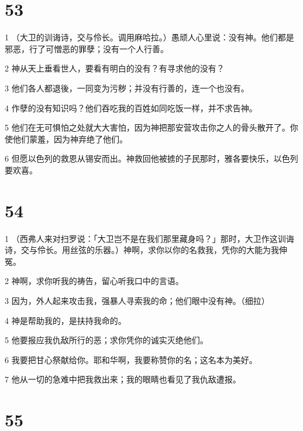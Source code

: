 \chapter{53}

\par 1 （大卫的训诲诗，交与伶长。调用麻哈拉。）愚顽人心里说：没有神。他们都是邪恶，行了可憎恶的罪孽；没有一个人行善。
\par 2 神从天上垂看世人，要看有明白的没有？有寻求他的没有？
\par 3 他们各人都退後，一同变为污秽；并没有行善的，连一个也没有。
\par 4 作孽的没有知识吗？他们吞吃我的百姓如同吃饭一样，并不求告神。
\par 5 他们在无可惧怕之处就大大害怕，因为神把那安营攻击你之人的骨头散开了。你使他们蒙羞，因为神弃绝了他们。
\par 6 但愿以色列的救恩从锡安而出。神救回他被掳的子民那时，雅各要快乐，以色列要欢喜。

\chapter{54}

\par 1 （西弗人来对扫罗说：「大卫岂不是在我们那里藏身吗？」那时，大卫作这训诲诗，交与伶长。用丝弦的乐器。）神啊，求你以你的名救我，凭你的大能为我伸冤。
\par 2 神啊，求你听我的祷告，留心听我口中的言语。
\par 3 因为，外人起来攻击我，强暴人寻索我的命；他们眼中没有神。（细拉）
\par 4 神是帮助我的，是扶持我命的。
\par 5 他要报应我仇敌所行的恶；求你凭你的诚实灭绝他们。
\par 6 我要把甘心祭献给你。耶和华啊，我要称赞你的名；这名本为美好。
\par 7 他从一切的急难中把我救出来；我的眼睛也看见了我仇敌遭报。

\chapter{55}

